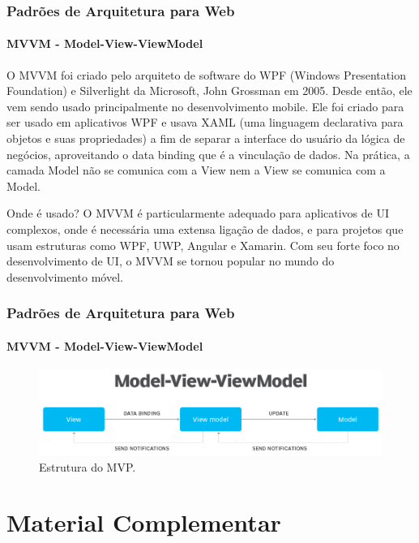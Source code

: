 \documentclass[
	10pt, %
	t, %
]{beamer}
\begin{document}
\begin{frame}
	\frametitle{Padrões de Arquitetura para Web}
	\framesubtitle{MVVM - Model-View-ViewModel}

	O MVVM foi criado pelo arquiteto de software do WPF  (Windows Presentation Foundation) e Silverlight da Microsoft, John Grossman em 2005. Desde então, ele vem sendo usado principalmente no desenvolvimento mobile. Ele foi criado para ser usado em aplicativos WPF e usava XAML (uma linguagem declarativa para objetos e suas propriedades) a fim de separar a interface do usuário da lógica de negócios, aproveitando o data binding que é a vinculação de dados. Na prática, a camada Model não se comunica com a View nem a View se comunica com a Model.

	\begin{block}{Onde é usado?}
		O MVVM é particularmente adequado para aplicativos de \alert{UI complexos}, onde é necessária uma extensa ligação de dados, e para projetos que usam estruturas como WPF, UWP, Angular e Xamarin. Com seu forte foco no desenvolvimento de UI, o MVVM se tornou popular no mundo do \alert{desenvolvimento móvel}.
	\end{block}

	
\end{frame}

\begin{frame}
	\frametitle{Padrões de Arquitetura para Web}
	\framesubtitle{MVVM - Model-View-ViewModel}

	\begin{figure}
		\centering
		\includegraphics[width=0.9\linewidth]{Images/mvvm.png}
		\caption{Estrutura do MVP.}\label{fig:mvvm}
	\end{figure}

\end{frame}

\section{Material Complementar}
\end{document}
